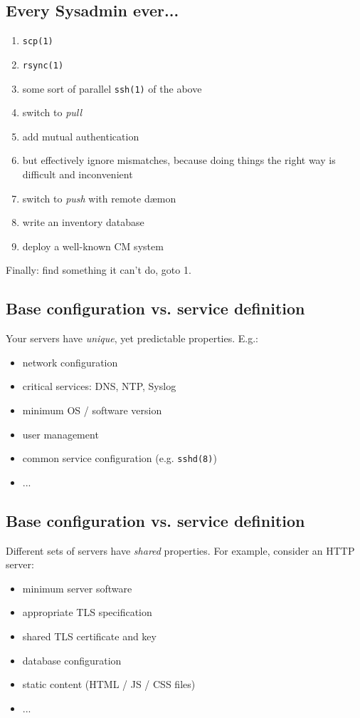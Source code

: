 \documentclass[xga]{xdvislides}
\begin{document}
\subsection{Every Sysadmin ever...}
\begin{enumerate}
	\item {\tt scp(1)}
	\item {\tt rsync(1)}
	\item some sort of parallel {\tt ssh(1)} of the above
	\item switch to {\em pull}
	\item add mutual authentication
	\item but effectively ignore mismatches, because doing things the right way is difficult and inconvenient
	\item switch to {\em push} with remote d\ae mon
	\item write an inventory database
	\item deploy a well-known CM system
\end{enumerate}
\vspace{.25in}

Finally: find something it can't do, goto 1.

\subsection{Base configuration vs. service definition}
Your servers have {\em unique}, yet predictable
properties.  E.g.:

\begin{itemize}
	\item network configuration
	\item critical services: DNS, NTP, Syslog 
	\item minimum OS / software version
	\item user management
	\item common service configuration (e.g. {\tt sshd(8)})
	\item ...
\end{itemize}

\subsection{Base configuration vs. service definition}
Different sets of servers have {\em shared}
properties.  For example, consider an HTTP server:

\begin{itemize}
	\item minimum server software
	\item appropriate TLS specification
	\item shared TLS certificate and key
	\item database configuration
	\item static content (HTML / JS / CSS files)
	\item ...
\end{itemize}
\end{document}
